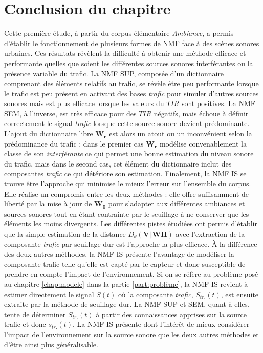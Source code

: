 \section{Conclusion du chapitre}
Cette première étude, à partir du corpus élémentaire \textit{Ambiance}, a permis d'établir le fonctionnement de plusieurs formes de NMF face à des scènes sonores urbaines. Ces résultats révèlent la difficulté à obtenir une méthode efficace et performante quelles que soient les différentes sources sonores interférantes ou la présence variable du trafic.
La NMF SUP, composée d'un dictionnaire comprenant des éléments relatifs au trafic, se révèle être peu performante lorsque le trafic est peu présent en activant des bases \textit{trafic} pour simuler d'autres sources sonores mais est plus efficace lorsque les valeurs du $TIR$ sont positives. La NMF SEM, à l'inverse, est très efficace pour des $TIR$ négatifs, mais échoue à définir correctement le signal \textit{trafic} lorsque cette source sonore devient prédominante. L'ajout du dictionnaire libre $\mathbf{W_r}$ est alors un atout ou un inconvénient selon la prédominance du trafic : dans le premier cas $\mathbf{W_r}$ modélise convenablement la classe de son \textit{interférante} ce qui permet une bonne estimation du niveau sonore du trafic, mais dans le second cas, cet élément du dictionnaire inclut des composantes \textit{trafic} ce qui détériore son estimation. Finalement, la NMF IS se trouve être l'approche qui minimise le mieux l'erreur sur l'ensemble du corpus. Elle réalise un compromis entre les deux méthodes : elle offre suffisamment de liberté par la mise à jour de $\mathbf{W_0}$ pour s'adapter aux différentes ambiances et sources sonores tout en étant contrainte par le seuillage à ne conserver que les éléments les moins divergents. Les différentes pistes étudiées ont permis d'établir que la simple estimation de la distance $D_{\theta}(\mathbf{V}\Vert\mathbf{WH})$ avec l'extraction de la composante \textit{trafic} par seuillage dur est l'approche la plus efficace. \`A la différence des deux autres méthodes, la NMF IS présente l'avantage de modéliser la composante trafic telle qu'elle est capté par le capteur et donc susceptible de prendre en compte l'impact de l'environnement. Si on se réfère au problème posé au chapitre \ref{chap:modele} dans la partie \ref{part:problème}, la NMF IS revient à estimer directement le signal $S(t)$ où la composante \textit{trafic}, $S_{tr.}(t)$, est ensuite extraite par la méthode de seuillage dur. La NMF SUP et SEM, quant à elles, tente de déterminer $S_{tr.}(t)$ à partir des connaissances apprises sur la source trafic et donc $s_{tr.}(t)$. La NMF IS présente dont l'intérêt de mieux considérer l'impact de l'environnement sur la source sonore que les deux autres méthodes et d'être ainsi plus généralisable.\\





%
